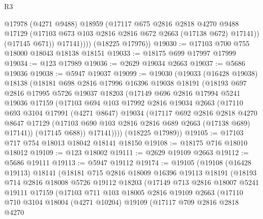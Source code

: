 \begin{lexlean}{R3}
\begin{coremodule}
                @17978
                (@4271 @9488)
                @18959
                (@17117
                  @675
                  @2816
                  @2818
                  @4270
                  @9488
                  @17129
                  (@17103 @673 @103 @2816 @2816 @672 @2663 (@17138 @672) @17141))
                (@17145 @671))
              @17141))))
      (@18225 @17976))
@19030 := @17103 @700 @755 @18000 @18043 @18138 @18151
@19033 := @18175 @699 @17997 @17999
@19034 := @123 @17989
@19036 := @2629 @19034 @2663
@19037 := @5686 @19036
@19038 := @5947 @19037
@19099 := @19030
    (@19033
      (@16428 @19038)
      @18138
      (@18181
        @698
        @2816
        @17996
        @16396
        @19038
        @18191
        (@18193
          @697
          @2816
          @17995
          @5726
          @19037
          @18203
          (@17149
            @696
            @2816
            @17994
            @5241
            @19036
            @17159
            (@17103
              @694
              @103
              @17992
              @2816
              @19034
              @2663
              (@17110
                @693
                @3104
                @17991
                (@4271 @8647)
                @19034
                (@17117
                  @692
                  @2816
                  @2818
                  @4270
                  @8647
                  @17129
                  (@17103 @690 @103 @2816 @2816 @689 @2663 (@17138 @689) @17141))
                (@17145 @688))
              @17141))))
      (@18225 @17989))
@19105 := @17103 @717 @754 @18013 @18042 @18141 @18150
@19108 := @18175 @716 @18010 @18012
@19109 := @123 @18002
@19111 := @2629 @19109 @2663
@19112 := @5686 @19111
@19113 := @5947 @19112
@19174 := @19105
    (@19108
      (@16428 @19113)
      @18141
      (@18181
        @715
        @2816
        @18009
        @16396
        @19113
        @18191
        (@18193
          @714
          @2816
          @18008
          @5726
          @19112
          @18203
          (@17149
            @713
            @2816
            @18007
            @5241
            @19111
            @17159
            (@17103
              @711
              @103
              @18005
              @2816
              @19109
              @2663
              (@17110
                @710
                @3104
                @18004
                (@4271 @10204)
                @19109
                (@17117
                  @709
                  @2816
                  @2818
                  @4270

\end{coremodule}
\end{lexlean}
